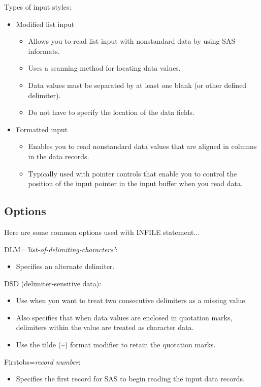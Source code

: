 \documentclass[11pt, oneside]{article}
\begin{document}
Types of input styles:
\begin{itemize}
\item Modified list input
	\begin{itemize}
	\item Allows you to read list input with nonstandard data by using SAS informats.
	\item Uses a scanning method for locating data values.
	\item Data values must be separated by at least one blank (or other defined delimiter).
	\item Do not have to specify the location of the data fields.
	\end{itemize}
\item Formatted input
	\begin{itemize}
	\item Enables you to read nonstandard data values that are aligned in columns in the data records.
	\item Typically used with pointer controls that enable you to control the position of the input pointer in the input buffer when you read data.
	\end{itemize}
\end{itemize}

\subsection{Options}

Here are some common options used with INFILE statement...

DLM=\textit{'list-of-delimiting-characters'}:
\begin{itemize}
\item Specifies an alternate delimiter.
\end{itemize}

DSD (delimiter-sensitive data):
\begin{itemize}
\item Use when you want to treat two consecutive delimiters as a missing value.
\item Also specifies that when data values are enclosed in quotation marks, delimiters within the value are treated as character data.
\item Use the tilde (\textasciitilde) format modifier to retain the quotation marks.
\end{itemize}

Firstobs=\textit{record number}:
\begin{itemize}
\item Specifies the first record for SAS to begin reading the input data records.
\end{itemize}
\end{document}
